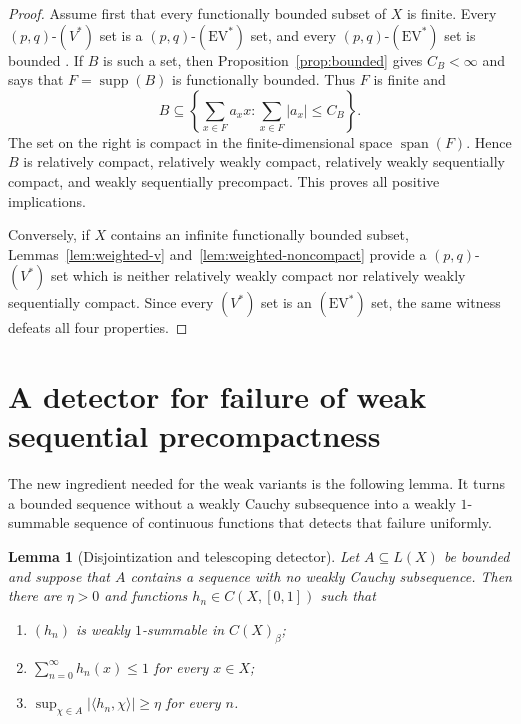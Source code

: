 \documentclass[11pt]{article}
\newtheorem{lemma}[theorem]{Lemma}
\newcommand{\supp}{\operatorname{supp}}
\newcommand{\EV}{\mathrm{EV}}
\begin{document}
\begin{proof}
Assume first that every functionally bounded subset of $X$ is finite.  Every
$(p,q)$-$(V^*)$ set is a $(p,q)$-$(\EV^*)$ set, and every
$(p,q)$-$(\EV^*)$ set is bounded
\cite[Lemma~7.2]{GabriyelyanPelczynski}.  If $B$ is such a set, then
Proposition~\ref{prop:bounded} gives $C_B<\infty$ and says that
$F=\supp(B)$ is functionally bounded.  Thus $F$ is finite and
\[
  B\subseteq
  \left\{\sum_{x\in F}a_xx:\sum_{x\in F}|a_x|\leq C_B\right\}.
\]
The set on the right is compact in the finite-dimensional space
$\operatorname{span}(F)$.  Hence $B$ is relatively compact, relatively weakly
compact, relatively weakly sequentially compact, and weakly sequentially
precompact.  This proves all positive implications.

Conversely, if $X$ contains an infinite functionally bounded subset,
Lemmas~\ref{lem:weighted-v} and~\ref{lem:weighted-noncompact} provide a
$(p,q)$-$(V^*)$ set which is neither relatively weakly compact nor relatively
weakly sequentially compact.  Since every $(V^*)$ set is an $(\EV^*)$ set, the
same witness defeats all four properties.
\end{proof}

\section{A detector for failure of weak sequential precompactness}

The new ingredient needed for the weak variants is the following lemma.  It
turns a bounded sequence without a weakly Cauchy subsequence into a weakly
$1$-summable sequence of continuous functions that detects that failure
uniformly.

\begin{lemma}[Disjointization and telescoping detector]\label{lem:detector}
Let $A\subseteq L(X)$ be bounded and suppose that $A$ contains a sequence with
no weakly Cauchy subsequence.  Then there are $\eta>0$ and functions
$h_n\in C(X,[0,1])$ such that
\begin{enumerate}[label=\textup{(\roman*)}]
\item $(h_n)$ is weakly $1$-summable in $C(X)_\beta$;
\item $\displaystyle \sum_{n=0}^\infty h_n(x)\leq1$ for every $x\in X$;
\item $\displaystyle \sup_{\chi\in A}|\langle h_n,\chi\rangle|\geq\eta$ for
every $n$.
\end{enumerate}
\end{lemma}
\end{document}
